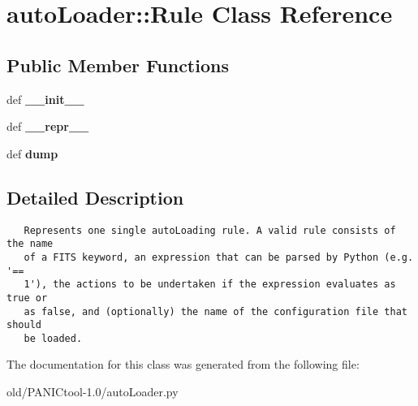 \section{auto\-Loader::Rule Class Reference}
\label{classautoLoader_1_1Rule}
\subsection*{Public Member Functions}
\begin{CompactItemize}
\item 
def \textbf{\_\-\_\-init\_\-\_\-}\label{classautoLoader_1_1Rule_91bbeb8f7c57756a3eaa6e38f3c42e30}

\item 
def \textbf{\_\-\_\-repr\_\-\_\-}\label{classautoLoader_1_1Rule_a8f83c9070e3e541d7fe28516d1511e9}

\item 
def \textbf{dump}\label{classautoLoader_1_1Rule_dfd7e3aa14bae03c10b94eeecd85cce7}

\end{CompactItemize}


\subsection{Detailed Description}


\footnotesize\begin{verbatim}
   Represents one single autoLoading rule. A valid rule consists of the name
   of a FITS keyword, an expression that can be parsed by Python (e.g. '==
   1'), the actions to be undertaken if the expression evaluates as true or
   as false, and (optionally) the name of the configuration file that should
   be loaded.
\end{verbatim}
\normalsize
 



The documentation for this class was generated from the following file:\begin{CompactItemize}
\item 
old/PANICtool-1.0/auto\-Loader.py\end{CompactItemize}
